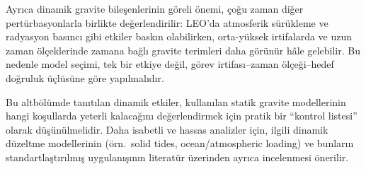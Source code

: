Ayrıca dinamik gravite bileşenlerinin göreli önemi, çoğu zaman diğer pertürbasyonlarla birlikte değerlendirilir:
LEO'da atmosferik sürükleme ve radyasyon basıncı gibi etkiler baskın olabilirken,
orta-yüksek irtifalarda ve uzun zaman ölçeklerinde zamana bağlı gravite terimleri daha görünür hâle gelebilir.
Bu nedenle model seçimi, tek bir etkiye değil, görev irtifası--zaman ölçeği--hedef doğruluk üçlüsüne göre yapılmalıdır.

\medskip
Bu altbölümde tanıtılan dinamik etkiler, kullanılan statik gravite modellerinin hangi koşullarda yeterli kalacağını
değerlendirmek için pratik bir ``kontrol listesi'' olarak düşünülmelidir. Daha isabetli ve hassas analizler için, ilgili dinamik düzeltme modellerinin (örn.\ solid tides, ocean/atmospheric loading) ve bunların standartlaştırılmış uygulanışının literatür üzerinden ayrıca incelenmesi önerilir.


